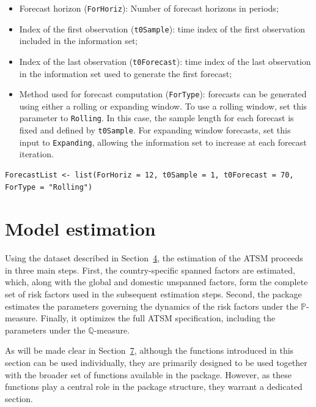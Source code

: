 \begin{itemize}
\tightlist
\item
  Forecast horizon (\texttt{ForHoriz}): Number of forecast horizons in periods;
\item
  Index of the first observation (\texttt{t0Sample}): time index of the first observation included in the information set;
\item
  Index of the last observation (\texttt{t0Forecast}): time index of the last observation in the information set used to generate the first forecast;
\item
  Method used for forecast computation (\texttt{ForType}): forecasts can be generated using either a rolling or expanding window. To use a rolling window, set this parameter to \texttt{Rolling}. In this case, the sample length for each forecast is fixed and defined by \texttt{t0Sample}. For expanding window forecasts, set this input to \texttt{Expanding}, allowing the information set to increase at each forecast iteration.
\end{itemize}

\begin{verbatim}
ForecastList <- list(ForHoriz = 12, t0Sample = 1, t0Forecast = 70, ForType = "Rolling")
\end{verbatim}

\section{Model estimation}\label{S:SectionEstimation}

Using the dataset described in Section~\hyperref[S:SectionData]{4}, the estimation of the ATSM proceeds in three main steps. First, the country-specific spanned factors are estimated, which, along with the global and domestic unspanned factors, form the complete set of risk factors used in the subsequent estimation steps. Second, the package estimates the parameters governing the dynamics of the risk factors under the \(\mathbb{P}\)-measure. Finally, it optimizes the full ATSM specification, including the parameters under the \(\mathbb{Q}\)-measure.

As will be made clear in Section~\hyperref[S:SectionImplementation]{7}, although the functions introduced in this section can be used individually, they are primarily designed to be used together with the broader set of functions available in the  package. However, as these functions play a central role in the package structure, they warrant a dedicated section.

